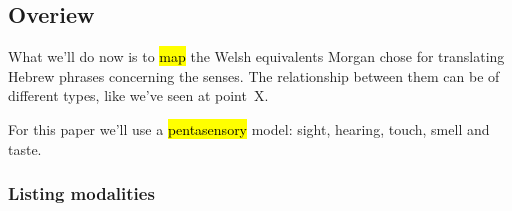 \setcounter{subsection}{-1}
\subsection{Overiew}

\begin{paper}


	What we’ll do now is to \hl{map} the Welsh equivalents Morgan chose for translating Hebrew phrases concerning the senses. The relationship between them can be of different types, like we’ve seen at point~X.

	For this paper we’ll use a \hl{pentasensory} model:  sight, hearing, touch, smell and taste.
\end{paper}




\subsubsection{Listing modalities}

